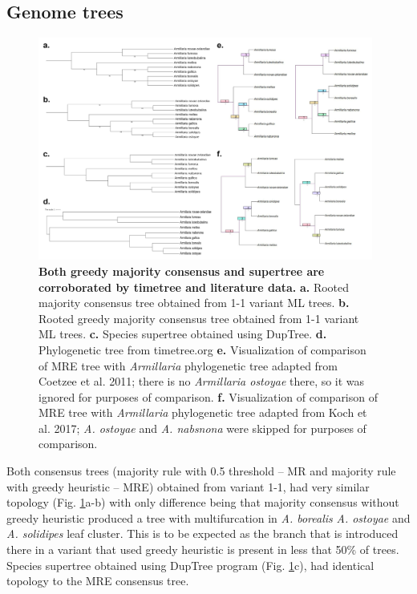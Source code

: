 \documentclass[two column, twoside, a4paper]{article}
\begin{document}
\subsection{Genome trees}

\begin{figure}[t]
  \begin{center}
    \includegraphics[width=0.98\textwidth]{figures/Figure_2.png}
  \end{center}
  \caption{\sf\textbf{Both greedy majority consensus and supertree are corroborated by timetree and literature data.} \textbf{a.} Rooted majority consensus tree obtained from 1-1 variant ML trees. \textbf{b.} Rooted greedy majority consensus tree obtained from 1-1 variant ML trees. \textbf{c.} Species supertree obtained using DupTree. \textbf{d.} Phylogenetic tree from timetree.org \textbf{e.} Visualization of comparison of MRE tree with \textit{Armillaria} phylogenetic tree adapted from Coetzee et al. 2011\protect\nocite{Coetzee2011}; there is no \textit{Armillaria ostoyae} there, so it was ignored for purposes of comparison. \textbf{f.} Visualization of comparison of MRE tree with \textit{Armillaria} phylogenetic tree adapted from Koch et al. 2017\protect\nocite{Koch2017}; \textit{A. ostoyae} and \textit{A. nabsnona} were skipped for purposes of comparison.}
  \label{fig:trees}
\end{figure}


Both consensus trees (majority rule with 0.5 threshold -- MR and majority rule with greedy heuristic -- MRE) obtained from variant 1-1, had very similar topology (Fig. \ref{fig:trees}a-b) with only difference being that majority consensus without greedy heuristic produced a tree with multifurcation in \textit{A. borealis} \textit{A. ostoyae} and \textit{A. solidipes} leaf cluster. This is to be expected as the branch that is introduced there in a variant that used greedy heuristic is present in less that 50\% of trees. Species supertree obtained using DupTree program (Fig. \ref{fig:trees}c), had identical topology to the MRE consensus tree.
\end{document}
